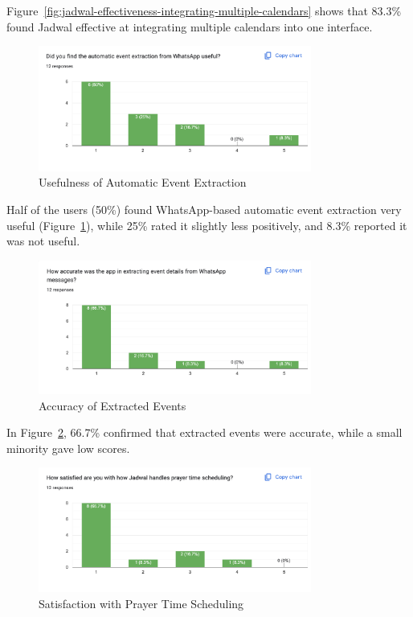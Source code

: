 Figure~\ref{fig:jadwal-effectiveness-integrating-multiple-calendars} shows that 83.3\% found Jadwal effective at integrating multiple calendars into one interface.

\begin{figure}[H]
\centering
\includegraphics[width=0.8\textwidth]{images/end-survey/07-automatic-event-extraction.png}
\caption{Usefulness of Automatic Event Extraction}
\label{fig:automatic-event-extraction}
\end{figure}

Half of the users (50\%) found WhatsApp-based automatic event extraction very useful (Figure~\ref{fig:automatic-event-extraction}), while 25\% rated it slightly less positively, and 8.3\% reported it was not useful.

\begin{figure}[H]
\centering
\includegraphics[width=0.8\textwidth]{images/end-survey/08-accuracy-of-extraction.png}
\caption{Accuracy of Extracted Events}
\label{fig:accuracy-of-extraction}
\end{figure}

In Figure~\ref{fig:accuracy-of-extraction}, 66.7\% confirmed that extracted events were accurate, while a small minority gave low scores.

\begin{figure}[H]
\centering
\includegraphics[width=0.8\textwidth]{images/end-survey/09-satisfaction-with-prayer-times.png}
\caption{Satisfaction with Prayer Time Scheduling}
\label{fig:satisfaction-with-prayer-times}
\end{figure}

